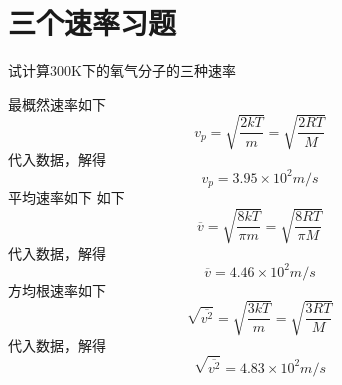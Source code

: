 \documentclass[lang=cn,10pt]{elegantbook}
\begin{document}
	\section{三个速率习题}
	\begin{example}
		试计算300K下的氧气分子的三种速率
	\end{example}
	\begin{solution}
		最概然速率如下
		\begin{equation*}
			v_{p}=\sqrt{\frac{2kT}{m}}=\sqrt{\dfrac{2RT}{M}}
		\end{equation*}
		代入数据，解得
		\begin{equation*}
				v_{p}=3.95\times10^{2}m/s
		\end{equation*}
		平均速率如下
		如下
		\begin{equation*}
			\overline{v}=\sqrt{\frac{8kT}{\pi m}}=\sqrt{\dfrac{8RT}{\pi M}}
		\end{equation*}
		代入数据，解得
		\begin{equation*}
			\overline{v}=4.46\times10^{2}m/s
		\end{equation*}
		方均根速率如下
		\begin{equation*}
			\sqrt{\overline{v^2}}=\sqrt{\frac{3kT}{m}}=\sqrt{\dfrac{3RT}{M}}
		\end{equation*}
		代入数据，解得
		\begin{equation*}
			\sqrt{\overline{v^2}}=4.83\times10^{2}m/s
		\end{equation*}
	\end{solution}
	
\end{document}
